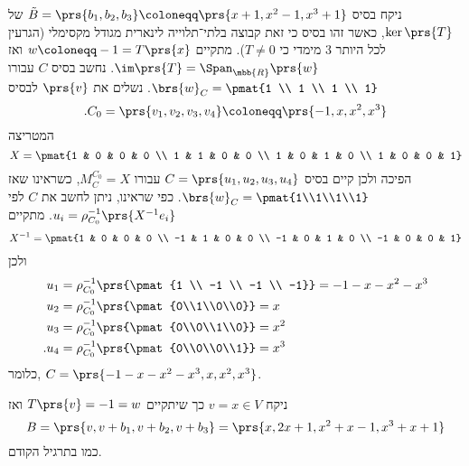 \documentclass[a4paper,10pt,twoside,openany]{book}
\begin{document}
\begin{solution}
ניקח בסיס
$\tilde{B} = \prs{b_1, b_2, b_3} \coloneqq \prs{x + 1, x^2 - 1, x^3 + 1}$
של
$\ker\prs{T}$,
כאשר זהו בסיס כי זאת קבוצה בלתי־תלוייה לינארית מגודל מקסימלי (הגרעין לכל היותר $3$ מימדי כי
$T \neq 0$).
מתקיים
$w \coloneqq -1 = T\prs{x}$
ואז
$\im\prs{T} = \Span_{\mbb{R}}\prs{w}$.
נחשב בסיס
$C$
עבורו
$\brs{w}_C = \pmat{1 \\ 1 \\ 1 \\ 1}$.
נשלים את
$\prs{v}$
לבסיס
\[\text{.} C_0 = \prs{v_1,v_2,v_3,v_4} \coloneqq \prs{-1,x,x^2,x^3}\]
המטריצה
\[X = \pmat{1 & 0 & 0 & 0 \\ 1 & 1 & 0 & 0 \\ 1 & 0 & 1 & 0 \\ 1 & 0 & 0 & 1}\]
הפיכה ולכן קיים בסיס
$C = \prs{u_1, u_2, u_3, u_4}$
עבורו
$M^{C_0}_C = X$,
כשראינו שאז
$\brs{w}_C = \pmat{1\\1\\1\\1}$.
כפי שראינו, ניתן לחשב את
$C$
לפי
$u_i = \rho_{C_0}^{-1}\prs{X^{-1} e_i}$.
מתקיים
\[X^{-1} = \pmat{1 & 0 & 0 & 0 \\ -1 & 1 & 0 & 0 \\ -1 & 0 & 1 & 0 \\ -1 & 0 & 0 & 1}\]
ולכן
\begin{align*}
u_1 &= \rho_{C_0}^{-1} \prs{\pmat{1 \\ -1 \\ -1 \\ -1}} = -1 -x - x^2 - x^3 \\
u_2 &= \rho_{C_0}^{-1} \prs{\pmat{0\\1\\0\\0}} = x \\
u_3 &= \rho_{C_0}^{-1} \prs{\pmat{0\\0\\1\\0}} = x^2 \\
\text{.} u_4 &= \rho_{C_0}^{-1} \prs{\pmat{0\\0\\0\\1}} = x^3
\end{align*}
כלומר,
$C = \prs{-1-x-x^2-x^3, x, x^2, x^3}$.

ניקח
$v = x \in V$
כך שיתקיים
$T\prs{v} = -1 = w$
ואז
\[B = \prs{v, v+b_1, v+b_2, v+b_3} = \prs{x, 2x+1, x^2+x-1, x^3 + x + 1}\]
כמו בתרגיל הקודם.


\end{solution}
\end{document}
